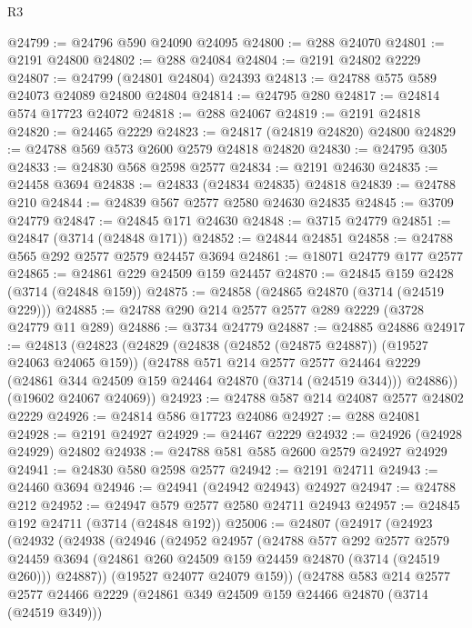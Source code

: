 \begin{lexlean}{R3}
\begin{coremodule}
@24799 := @24796 @590 @24090 @24095
@24800 := @288 @24070
@24801 := @2191 @24800
@24802 := @288 @24084
@24804 := @2191 @24802 @2229
@24807 := @24799 (@24801 @24804) @24393
@24813 := @24788 @575 @589 @24073 @24089 @24800 @24804
@24814 := @24795 @280
@24817 := @24814 @574 @17723 @24072
@24818 := @288 @24067
@24819 := @2191 @24818
@24820 := @24465 @2229
@24823 := @24817 (@24819 @24820) @24800
@24829 := @24788 @569 @573 @2600 @2579 @24818 @24820
@24830 := @24795 @305
@24833 := @24830 @568 @2598 @2577
@24834 := @2191 @24630
@24835 := @24458 @3694
@24838 := @24833 (@24834 @24835) @24818
@24839 := @24788 @210
@24844 := @24839 @567 @2577 @2580 @24630 @24835
@24845 := @3709 @24779
@24847 := @24845 @171 @24630
@24848 := @3715 @24779
@24851 := @24847 (@3714 (@24848 @171))
@24852 := @24844 @24851
@24858 := @24788 @565 @292 @2577 @2579 @24457 @3694
@24861 := @18071 @24779 @177 @2577
@24865 := @24861 @229 @24509 @159 @24457
@24870 := @24845 @159 @2428 (@3714 (@24848 @159))
@24875 := @24858 (@24865 @24870 (@3714 (@24519 @229)))
@24885 := @24788 @290 @214 @2577 @2577 @289 @2229 (@3728 @24779 @11 @289)
@24886 := @3734 @24779
@24887 := @24885 @24886
@24917 := @24813
    (@24823
      (@24829
        (@24838 (@24852 (@24875 @24887)) (@19527 @24063 @24065 @159))
        (@24788
          @571
          @214
          @2577
          @2577
          @24464
          @2229
          (@24861 @344 @24509 @159 @24464 @24870 (@3714 (@24519 @344)))
          @24886))
      (@19602 @24067 @24069))
@24923 := @24788 @587 @214 @24087 @2577 @24802 @2229
@24926 := @24814 @586 @17723 @24086
@24927 := @288 @24081
@24928 := @2191 @24927
@24929 := @24467 @2229
@24932 := @24926 (@24928 @24929) @24802
@24938 := @24788 @581 @585 @2600 @2579 @24927 @24929
@24941 := @24830 @580 @2598 @2577
@24942 := @2191 @24711
@24943 := @24460 @3694
@24946 := @24941 (@24942 @24943) @24927
@24947 := @24788 @212
@24952 := @24947 @579 @2577 @2580 @24711 @24943
@24957 := @24845 @192 @24711 (@3714 (@24848 @192))
@25006 := @24807
    (@24917
      (@24923
        (@24932
          (@24938
            (@24946
              (@24952
                @24957
                (@24788
                  @577
                  @292
                  @2577
                  @2579
                  @24459
                  @3694
                  (@24861 @260 @24509 @159 @24459 @24870 (@3714 (@24519 @260)))
                  @24887))
              (@19527 @24077 @24079 @159))
            (@24788
              @583
              @214
              @2577
              @2577
              @24466
              @2229
              (@24861 @349 @24509 @159 @24466 @24870 (@3714 (@24519 @349)))

\end{coremodule}
\end{lexlean}
